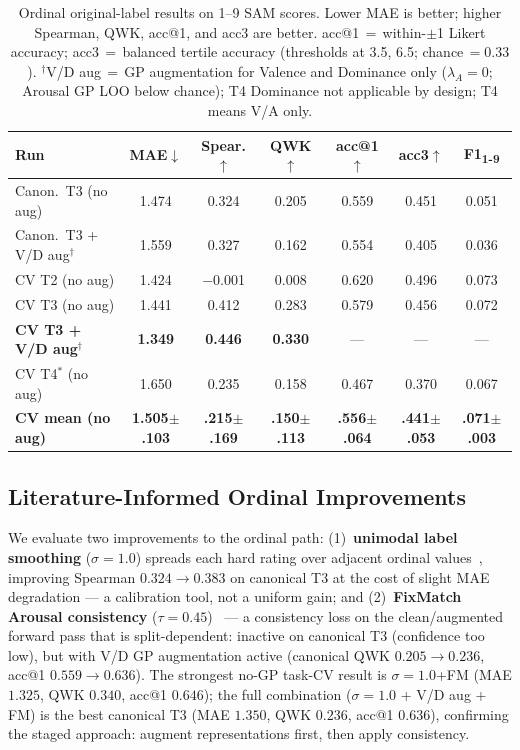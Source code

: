 \documentclass[sigconf,review,anonymous]{acmart}
\begin{document}
\begin{table}[t]
\caption{Ordinal original-label results on 1--9 SAM scores.  Lower MAE is
better; higher Spearman, QWK, acc@1, and acc3 are better.
acc@1\,$=$\,within-$\pm$1 Likert accuracy; acc3\,$=$\,balanced tertile accuracy
(thresholds at 3.5, 6.5; chance\,$=0.33$).
$^\dagger$V/D aug\,$=$\,GP augmentation for Valence and Dominance only
($\lambda_A{=}0$; Arousal GP LOO below chance);
T4 Dominance not applicable by design; T4 means V/A only.}
\label{tab:ordinal}
\centering
\setlength{\tabcolsep}{2pt}
\scriptsize
\begin{tabular}{lcccccc}
\toprule
\textbf{Run} & \textbf{MAE}$\downarrow$ & \textbf{Spear.}$\uparrow$ &
\textbf{QWK}$\uparrow$ & \textbf{acc@1}$\uparrow$ & \textbf{acc3}$\uparrow$ &
\textbf{F1\textsubscript{1-9}} \\
\midrule
Canon.\ T3 (no aug) & 1.474 & 0.324 & 0.205 & 0.559 & 0.451 & 0.051 \\
Canon.\ T3 + V/D aug$^\dagger$ & 1.559 & 0.327 & 0.162 & 0.554 & 0.405 & 0.036 \\
\midrule
CV T2 (no aug)   & 1.424 & $-$0.001 & 0.008 & 0.620 & 0.496 & 0.073 \\
CV T3 (no aug)   & 1.441 & 0.412  & 0.283 & 0.579 & 0.456 & 0.072 \\
\textbf{CV T3 + V/D aug}$^\dagger$ & \textbf{1.349} & \textbf{0.446} & \textbf{0.330} & --- & --- & --- \\
CV T4$^*$ (no aug) & 1.650 & 0.235 & 0.158 & 0.467 & 0.370 & 0.067 \\
\textbf{CV mean (no aug)} & \textbf{1.505$\pm$.103} &
\textbf{.215$\pm$.169} & \textbf{.150$\pm$.113} &
\textbf{.556$\pm$.064} & \textbf{.441$\pm$.053} &
\textbf{.071$\pm$.003} \\
\bottomrule
\end{tabular}
\end{table}

\subsection{Literature-Informed Ordinal Improvements}
\label{sec:ordinal_improvements}

We evaluate two improvements to the ordinal path:
(1)~\textbf{unimodal label smoothing} ($\sigma{=}1.0$) spreads each hard
rating over adjacent ordinal values~\cite{wen2023ordinal}, improving
Spearman $0.324\to0.383$ on canonical T3 at the cost of slight MAE
degradation --- a calibration tool, not a uniform gain; and
(2)~\textbf{FixMatch Arousal consistency} ($\tau{=}0.45$)~\cite{sohn2020fixmatch}
--- a consistency loss on the clean/augmented forward pass that is
split-dependent: inactive on canonical T3 (confidence too low), but with
V/D GP augmentation active (canonical QWK $0.205\to0.236$, acc@1 $0.559\to0.636$).
The strongest no-GP task-CV result is $\sigma{=}1.0$+FM
(MAE $1.325$, QWK $0.340$, acc@1 $0.646$); the full combination
($\sigma{=}1.0$ + V/D aug + FM) is the best canonical T3
(MAE $1.350$, QWK $0.236$, acc@1 $0.636$), confirming the staged
approach: augment representations first, then apply consistency.
\end{document}

